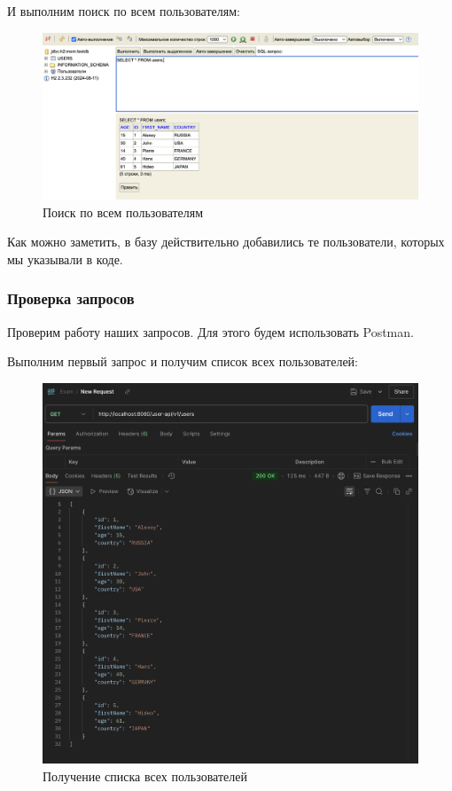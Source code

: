 \documentclass[a4paper, 14pt]{article}
\begin{document}
И выполним поиск по всем пользователям:

\begin{figure}[H]
	\centering
	\includegraphics[width=17cm]{resources/4.png}
	\caption{Поиск по всем пользователям}
\end{figure}

Как можно заметить, в базу действительно добавились те пользователи, которых мы указывали в коде.

\subsubsection{Проверка запросов}

Проверим работу наших запросов. Для этого будем использовать Postman.

Выполним первый запрос и получим список всех пользователей:

\begin{figure}[H]
	\centering
	\includegraphics[width=15cm]{resources/5.png}
	\caption{Получение списка всех пользователей}
\end{figure}
\end{document}
